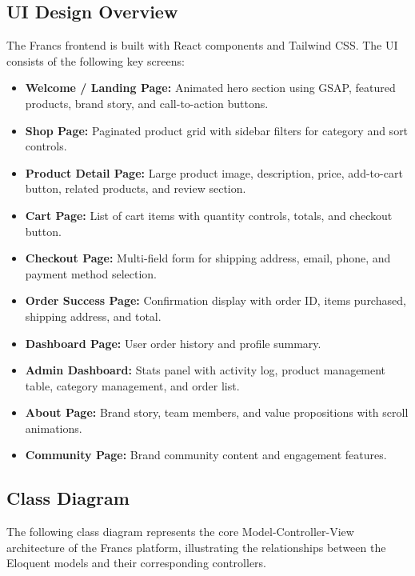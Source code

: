 \subsection{UI Design Overview}
The Francs frontend is built with React components and Tailwind CSS. The UI consists of the following key screens:
\begin{itemize}
    \item \textbf{Welcome / Landing Page:} Animated hero section using GSAP, featured products, brand story, and call-to-action buttons.
    \item \textbf{Shop Page:} Paginated product grid with sidebar filters for category and sort controls.
    \item \textbf{Product Detail Page:} Large product image, description, price, add-to-cart button, related products, and review section.
    \item \textbf{Cart Page:} List of cart items with quantity controls, totals, and checkout button.
    \item \textbf{Checkout Page:} Multi-field form for shipping address, email, phone, and payment method selection.
    \item \textbf{Order Success Page:} Confirmation display with order ID, items purchased, shipping address, and total.
    \item \textbf{Dashboard Page:} User order history and profile summary.
    \item \textbf{Admin Dashboard:} Stats panel with activity log, product management table, category management, and order list.
    \item \textbf{About Page:} Brand story, team members, and value propositions with scroll animations.
    \item \textbf{Community Page:} Brand community content and engagement features.
\end{itemize}

\subsection{Class Diagram}
The following class diagram represents the core Model-Controller-View architecture of the Francs platform, illustrating the relationships between the Eloquent models and their corresponding controllers.


